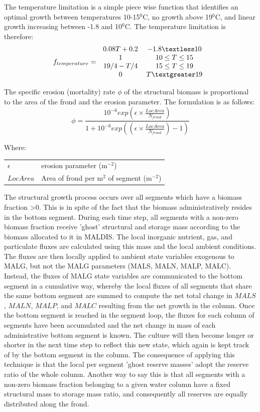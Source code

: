 \documentclass{deltares_manual}
\begin{document}
The temperature limitation is a simple piece wise function that identifies an optimal growth between temperatures 10-15$^0$C, no growth above 19$^0$C, and linear growth increasing between -1.8 and 10$^0$C. The temperature limitation is therefore:
\begin{equation}
f_{temperature} =  
\left 
.\begin{tabular}{cc}
$ 0.08T + 0.2 $    & $-1.8 \textless 10$ \\
$  1 $             & $10 \leq T \leq 15$ \\
$19/4 - T/4$       & $15 \leq T \leq 19$ \\ 
$0$                & $T \textgreater 19$ \\
\end{tabular}
\right
.\end{equation}

The specific erosion (mortality) rate $\phi$ of the structural biomass is proportional to the area of the frond and the erosion parameter. The formulation is as follows:
\begin{equation}
\phi = \frac{10^{-6}exp(\epsilon\times \frac{LocArea}{N_{frond}})}{1+10^{-6}exp((\epsilon\times \frac{LocArea}{N_{frond}})-1)}
\end{equation}

Where:\\
\begin{tabular}{ll}
$\epsilon$ & erosion parameter (m$^{-2}$)\\
$LocArea$ & Area of frond per m$^{2}$ of segment (m$^{-2}$)
\end{tabular}

The structural growth process occurs over all segments which have a biomass fraction \textgreater 0. This is in spite of the fact that the biomass administratively resides in the bottom segment. During each time step, all segments with a non-zero biomass fraction receive 'ghost' structural and storage mass according to the biomass allocated to it in MALDIS. The local inorganic nutrient, gas, and particulate fluxes are calculated using this mass and the local ambient conditions. The fluxes are then locally applied to ambient state variables exogenous to MALG, but not the MALG parameters (MALS, MALN, MALP, MALC). Instead, the fluxes of MALG state variables are communicated to the bottom segment in a cumulative way, whereby the local fluxes of all segments that share the same bottom segment are summed to compute the net total change in $MALS$, $MALN$, $MALP$, and $MALC$ resulting from the net growth in the column. Once the bottom segment is reached in the segment loop, the fluxes for each column of segments have been accumulated and the net change in mass of each administrative bottom segment is known. The culture will then become longer or shorter in the next time step to reflect this new state, which again is kept track of by the bottom segment in the column. The consequence of applying this technique is that the local per segment 'ghost reserve masses' adopt the reserve ratio of the whole column. Another way to say this is that all segments with a non-zero biomass fraction belonging to a given water column have a fixed structural mass to storage mass ratio, and consequently all reserves are equally distributed along the frond.
\pagebreak
\end{document}

